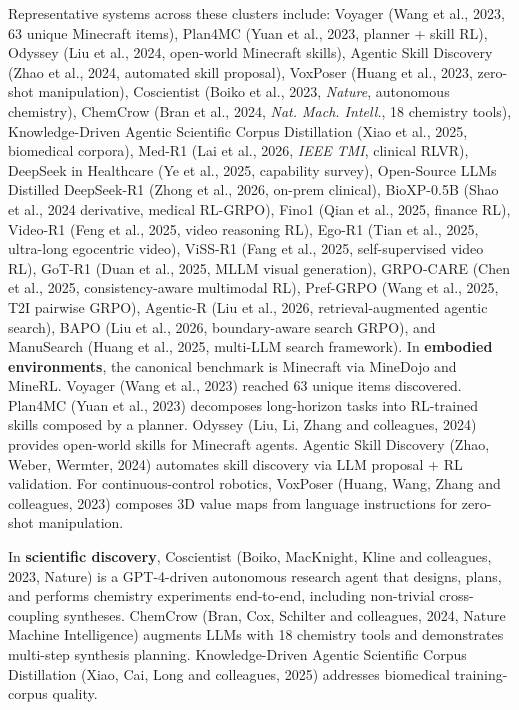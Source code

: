 Representative systems across these clusters include: Voyager (Wang et al., 2023, 63 unique Minecraft items), Plan4MC (Yuan et al., 2023, planner + skill RL), Odyssey (Liu et al., 2024, open-world Minecraft skills), Agentic Skill Discovery (Zhao et al., 2024, automated skill proposal), VoxPoser (Huang et al., 2023, zero-shot manipulation), Coscientist (Boiko et al., 2023, \emph{Nature}, autonomous chemistry), ChemCrow (Bran et al., 2024, \emph{Nat. Mach. Intell.}, 18 chemistry tools), Knowledge-Driven Agentic Scientific Corpus Distillation (Xiao et al., 2025, biomedical corpora), Med-R1 (Lai et al., 2026, \emph{IEEE TMI}, clinical RLVR), DeepSeek in Healthcare (Ye et al., 2025, capability survey), Open-Source LLMs Distilled DeepSeek-R1 (Zhong et al., 2026, on-prem clinical), BioXP-0.5B (Shao et al., 2024 derivative, medical RL-GRPO), Fino1 (Qian et al., 2025, finance RL), Video-R1 (Feng et al., 2025, video reasoning RL), Ego-R1 (Tian et al., 2025, ultra-long egocentric video), ViSS-R1 (Fang et al., 2025, self-supervised video RL), GoT-R1 (Duan et al., 2025, MLLM visual generation), GRPO-CARE (Chen et al., 2025, consistency-aware multimodal RL), Pref-GRPO (Wang et al., 2025, T2I pairwise GRPO), Agentic-R (Liu et al., 2026, retrieval-augmented agentic search), BAPO (Liu et al., 2026, boundary-aware search GRPO), and ManuSearch (Huang et al., 2025, multi-LLM search framework). In \textbf{embodied environments}, the canonical benchmark is Minecraft via MineDojo and MineRL. Voyager (Wang et al., 2023) reached 63 unique items discovered. Plan4MC (Yuan et al., 2023) decomposes long-horizon tasks into RL-trained skills composed by a planner. Odyssey (Liu, Li, Zhang and colleagues, 2024) provides open-world skills for Minecraft agents. Agentic Skill Discovery (Zhao, Weber, Wermter, 2024) automates skill discovery via LLM proposal + RL validation. For continuous-control robotics, VoxPoser (Huang, Wang, Zhang and colleagues, 2023) composes 3D value maps from language instructions for zero-shot manipulation.

In \textbf{scientific discovery}, Coscientist (Boiko, MacKnight, Kline and colleagues, 2023, Nature) is a GPT-4-driven autonomous research agent that designs, plans, and performs chemistry experiments end-to-end, including non-trivial cross-coupling syntheses. ChemCrow (Bran, Cox, Schilter and colleagues, 2024, Nature Machine Intelligence) augments LLMs with 18 chemistry tools and demonstrates multi-step synthesis planning. Knowledge-Driven Agentic Scientific Corpus Distillation (Xiao, Cai, Long and colleagues, 2025) addresses biomedical training-corpus quality.

